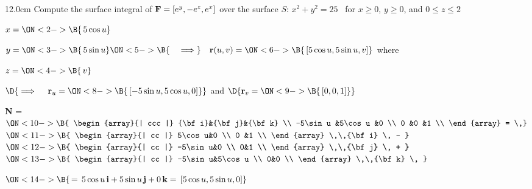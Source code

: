 \begin{frame}
\begin{columns}\begin{column}{12.0cm}
\scriptsize
\EX Compute the surface integral of ${\bf F} = [e^y, -e^z, e^x]$ over the surface $S:\, x^2 + y^2 = 25$ \, for $x \ge 0$, $y \ge 0$, and $0 \le z \le 2$

\vspace{0.2cm}

\quad $
x =
\ON<2->{\B{\,5 \cos u}}$

\quad $
y =
\ON<3->{\B{\,5 \sin u}}
\ON<5->{\B{\quad \implies}} \quad {\bf r}(u,v) =
\ON<6->{\B{\, [5\cos u,5 \sin u,v]}}$ \qquad where \quad
{}

\quad $
z =
\ON<4->{\B{\,v}}$

\vspace{0.2cm}
\hspace{1.3cm} $\D{
\implies \quad {\bf r}_u =
\ON<8->{\B{\, [-5\sin u,5\cos u,0]}}}$ \qquad 
and
\qquad $\D{
{\bf r}_v = 
\ON<9->{\B{\,[0,0,1]}}}$

\vspace{0.3cm}

{\bf N} = \,
$\ON<10->{\B{
\begin{array}{| ccc |}
	{\bf i}&{\bf j}&{\bf k} \\
	-5\sin u      &5\cos u     &0 \\
 	0      &0      &1 \\
\end{array}
= \,}}$
$\ON<11->{\B{
\begin{array}{| cc |}
		  5\cos u&0 \\
 		  0 &1 \\
\end{array}
 \,\,{\bf i} \, - }}$\,\,
$\ON<12->{\B{
\begin{array}{| cc |}
		  -5\sin u&0 \\
 		  0&1 \\
\end{array}
 \,\,{\bf j} \, + }}$\,\,
$\ON<13->{\B{
\begin{array}{| cc |}
		  -5\sin u&5\cos u \\
 		  0&0 \\
\end{array}
\,\,{\bf k} \, }}$\\

\vspace{0.3cm}

\hspace{3.65cm} $\ON<14->{\B{\, = \, 5\cos u \,{\bf i} + 5\sin u\,{\bf j} + 0\,{\bf k} = \, [5\cos u,5\sin u,0]}}$


\end{column}
\end{columns}
\end{frame}
